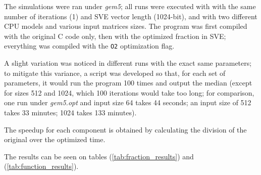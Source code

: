 \documentclass[conference]{IEEEtran}
\begin{document}

The simulations were ran under \textit{gem5}; all runs were executed with with the same number of iterations (1) and SVE vector length (1024-bit), and with two different CPU models and various input matrices sizes. 
The program was first compiled with the original C code only, then with the optimized fraction in SVE; everything was compiled with the \verb|O2| optimization flag.

A slight variation was noticed in different runs with the exact same parameters; to mitigate this variance, a script was developed so that, for each set of parameters, it would run the program 100 times and output the median (except for sizes 512 and 1024, which 100 iterations would take too long; for comparison, one run under \textit{gem5.opt} and input size 64 takes 44 seconds; an input size of 512 takes 33 minutes; 1024 takes 133 minutes).

The speedup for each component is obtained by calculating the division of the original over the optimized time.

The results can be seen on tables (\ref{tab:fraction_results}) and (\ref{tab:function_results}).
\end{document}

